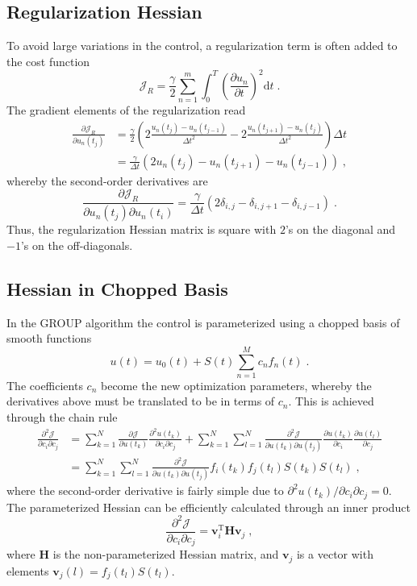 \subsection*{Regularization Hessian}
To avoid large variations in the control, a regularization term is often added to the cost function
\begin{equation}
	\mathcal{J}_R =\frac{\gamma}{2} \sum_{n=1}^{m} \int_{0}^{T} \left( \frac{\partial u_n}{ \partial t} \right)^2 \mathrm{d}t \; .
\end{equation} 
The gradient elements of the regularization read
\begin{align}
	\frac{\partial \mathcal{J}_R}{\partial u_n (t_j)} &= \frac{\gamma}{2} \left( 2 \frac{u_n (t_j) - u_n (t_{j-1})}{\Delta t^2} - 2 \frac{u_n (t_{j+1}) - u_n (t_j)}{\Delta t^2} \right) \Delta t \nonumber \\
	&= \frac{\gamma}{\Delta t} \left( 2 u_n (t_j) - u_n (t_{j+1}) - u_n (t_{j-1}) \right) \; ,
\end{align}
whereby the second-order derivatives are
\begin{equation}
	\frac{\partial \mathcal{J}_R}{\partial u_n (t_j) \partial u_n (t_i)} = \frac{\gamma}{\Delta t} \left( 2 \delta_{i,j} - \delta_{i,j+1} - \delta_{i,j-1} \right) \; .
\end{equation}
Thus, the regularization Hessian matrix is square with $2$'s on the diagonal and $-1$'s on the off-diagonals.


\subsection*{Hessian in Chopped Basis}
In the GROUP algorithm the control is parameterized using a chopped basis of smooth functions
\begin{equation}
	u(t) = u_0 (t) + S(t) \sum_{n=1}^{M} c_n f_n (t) \; .
\end{equation}    
The coefficients $c_n$ become the new optimization parameters, whereby the derivatives above must be translated to be in terms of $c_n$. This is achieved through the chain rule
\begin{align}
	\frac{\partial^2 \mathcal{J}}{\partial c_i \partial c_j} &= \sum_{k = 1}^{N} \frac{\partial \mathcal{J}}{\partial u (t_k)} \frac{\partial ^2 u (t_k)}{\partial c_i \partial c_j} + \sum_{k = 1}^{N} \sum_{l = 1}^{N} \frac{\partial^2 \mathcal{J}}{\partial u (t_k) \partial u (t_j)} \frac{\partial u (t_k)}{\partial c_i} \frac{\partial u (t_l)}{\partial c_j} \nonumber \\
	&= \sum_{k = 1}^{N} \sum_{l = 1}^{N} \frac{\partial^2 \mathcal{J}}{\partial u (t_k) \partial u (t_j)} f_i (t_k) f_j (t_l) S(t_k) S(t_l) \; ,
\end{align}
where the second-order derivative is fairly simple due to ${\partial ^2 u (t_k)}/{\partial c_i \partial c_j} = 0$.
The parameterized Hessian can be efficiently calculated through an inner product
\begin{equation}
	\frac{\partial^2 \mathcal{J}}{\partial c_i \partial c_j} = \boldsymbol{v}_{i}^{\mathrm{T}} \boldsymbol{H} \boldsymbol{v}_j \; ,
\end{equation}
where $\boldsymbol{H}$ is the non-parameterized Hessian matrix, and $\boldsymbol{v}_j$ is a vector with elements $\boldsymbol{v}_j (l) = f_j (t_l) S(t_l)$.